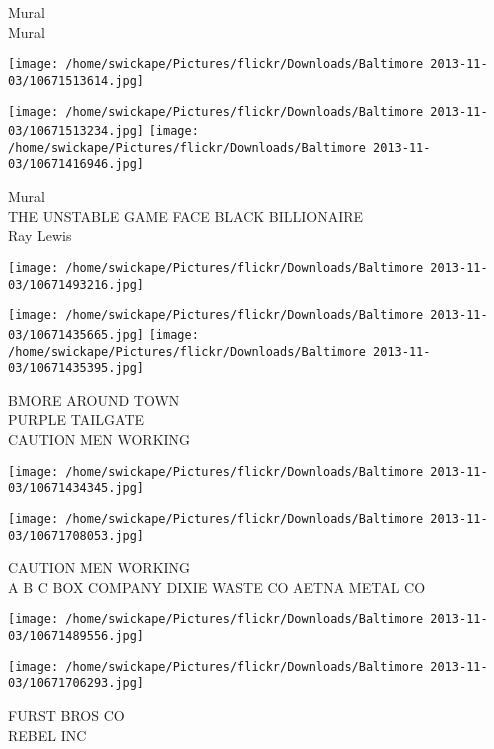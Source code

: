 \documentclass[10pt,letterpaper]{article}
\begin{document}
Mural\\
Mural\\
\pagebreak

\texttt{[image: /home/swickape/Pictures/flickr/Downloads/Baltimore 2013-11-03/10671513614.jpg]}

\vspace{0.25in}
\texttt{[image: /home/swickape/Pictures/flickr/Downloads/Baltimore 2013-11-03/10671513234.jpg]}
\texttt{[image: /home/swickape/Pictures/flickr/Downloads/Baltimore 2013-11-03/10671416946.jpg]}

Mural\\
THE UNSTABLE GAME FACE BLACK BILLIONAIRE\\
Ray Lewis\\
\pagebreak

\texttt{[image: /home/swickape/Pictures/flickr/Downloads/Baltimore 2013-11-03/10671493216.jpg]}

\vspace{0.25in}
\texttt{[image: /home/swickape/Pictures/flickr/Downloads/Baltimore 2013-11-03/10671435665.jpg]}
\texttt{[image: /home/swickape/Pictures/flickr/Downloads/Baltimore 2013-11-03/10671435395.jpg]}

BMORE AROUND TOWN\\
PURPLE TAILGATE\\
CAUTION MEN WORKING\\
\pagebreak

\texttt{[image: /home/swickape/Pictures/flickr/Downloads/Baltimore 2013-11-03/10671434345.jpg]}

\vspace{0.25in}
\texttt{[image: /home/swickape/Pictures/flickr/Downloads/Baltimore 2013-11-03/10671708053.jpg]}

CAUTION MEN WORKING\\
A B C BOX COMPANY DIXIE WASTE CO AETNA METAL CO\\
\pagebreak

\texttt{[image: /home/swickape/Pictures/flickr/Downloads/Baltimore 2013-11-03/10671489556.jpg]}

\vspace{0.25in}
\texttt{[image: /home/swickape/Pictures/flickr/Downloads/Baltimore 2013-11-03/10671706293.jpg]}

FURST BROS CO\\
REBEL INC\\
\pagebreak
\end{document}
